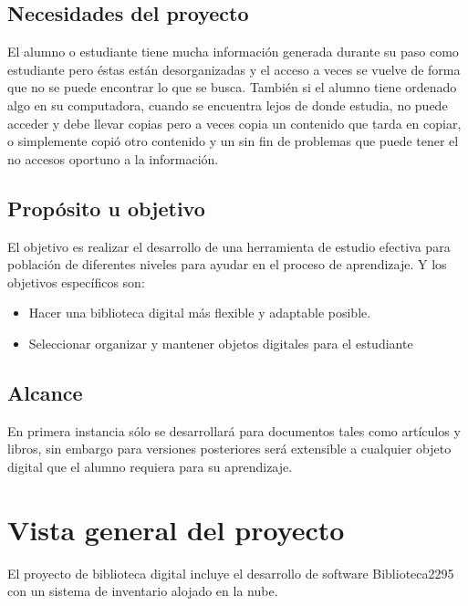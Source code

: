 \section{Necesidades del proyecto}
El alumno o estudiante tiene mucha información generada durante su paso como estudiante pero éstas están desorganizadas y el acceso a veces se vuelve de forma que no se puede encontrar lo que se busca. También si el alumno tiene ordenado algo en su computadora, cuando se encuentra lejos de donde estudia, no puede acceder y debe llevar copias pero a veces copia un contenido que tarda en copiar,  o simplemente copió otro contenido y un sin fin de problemas que puede tener el no accesos oportuno a la información. 
\section{Propósito u objetivo}
El objetivo es realizar el desarrollo de una herramienta de estudio efectiva para población de diferentes niveles para ayudar en el  proceso de aprendizaje.  
Y los objetivos específicos son:
\begin{itemize}
	\item Hacer una biblioteca digital más flexible y adaptable posible.
	\item Seleccionar organizar y mantener objetos digitales para el estudiante
\end{itemize}

\section{Alcance}
En primera instancia sólo se desarrollará para documentos tales como artículos y libros, sin embargo para versiones posteriores será extensible a cualquier objeto digital que el alumno requiera para su aprendizaje. 
\chapter*{Vista general del proyecto}
El proyecto de biblioteca digital incluye el desarrollo de software Biblioteca2295 con un sistema de inventario alojado en la nube.
